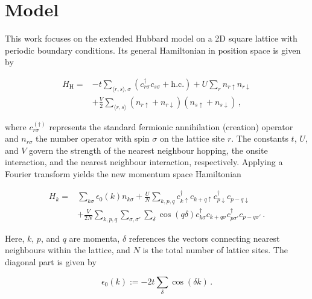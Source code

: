 \chapter{Model}
\label{chap:model}

This work focuses on the extended Hubbard model on a 2D square lattice with periodic boundary conditions.
Its general Hamiltonian in position space is given by

\begin{equation}
    \begin{aligned}
        H_\text{H} =&-t \sum_{\langle r,s \rangle,\sigma} \left( c_{r\sigma}^\dagger c_{s\sigma} + \text{h.c.} \right) 
                        + U \sum_r n_{r\uparrow} n_{r\downarrow} \\
                    &+ \frac{V}{2} \sum_{\langle r,s \rangle} \left( n_{r\uparrow} + n_{r\downarrow} \right) 
                        \left( n_{s\uparrow} + n_{s\downarrow} \right)\,,
    \end{aligned}  
\end{equation}

where $c_{r\sigma}^{(\dagger)}$ represents the standard fermionic annihilation (creation) operator 
and $n_{r\sigma}$ the number operator with spin $\sigma$ on the lattice site $r$.
The constants $t$, $U$, and $V$ govern the strength of the nearest neighbour hopping, 
the onsite interaction, and the nearest neighbour interaction, respectively.
Applying a Fourier transform yields the new momentum space Hamiltonian

\begin{equation}
    \begin{aligned}
        H_k =& \sum_{k \sigma} \epsilon_0 (k) n_{k\sigma} 
                + \frac{U}{N} \sum_{k,p,q} c_{k\uparrow}^\dagger c_{k+q\uparrow} c_{p\downarrow}^\dagger c_{p-q\downarrow} \\
            &+ \frac{V}{2N} \sum_{k,p,q} \sum_{\sigma, \sigma'} \sum_{\delta} \cos(q\delta) 
                    c_{k\sigma}^\dagger c_{k+q\sigma} c_{p\sigma'}^\dagger c_{p-q\sigma'}\,.
    \end{aligned} 
\end{equation}

Here, $k$, $p$, and $q$ are momenta, $\delta$ references the vectors connecting nearest neighbours within the lattice,
and $N$ is the total number of lattice sites.
The diagonal part is given by

\begin{equation}
    \epsilon_0 (k) := -2t \sum_\delta \cos(\delta k)\,.
\end{equation}